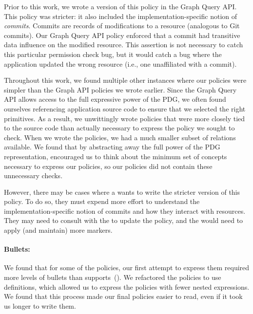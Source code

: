 Prior to this work, we wrote a version of this policy in the Graph Query API.
%
This policy was stricter: it also included the implementation-specific notion of \emph{commits}.
%
Commits are records of modifications to a resource (analogous to Git commits).
%
Our Graph Query API policy enforced that a commit had transitive data influence on the modified resource.
%
This assertion is not necessary to catch this particular permission check bug, 
but it would catch a bug where the application updated the wrong resource (i.e., one unaffiliated with a commit).
%

Throughout this work, we found multiple other instances where our \syslang{}
policies were simpler than the Graph API policies we wrote earlier.
%
Since the Graph Query API allows \devs{} access to the full expressive power of the PDG,
we often found ourselves referencing application source code to ensure that we selected the right primitives.
%
As a result, we unwittingly wrote policies that were more closely tied to the 
source code than actually necessary to express the policy we sought to check.
%
When we wrote the \syslang{} policies, 
we had a much smaller subset of relations available.
%
We found that by abstracting away the full power of the PDG representation,
\syslang{} encouraged us to think about the minimum set of concepts
necessary to express our policies,
so our policies did not contain these unnecessary checks.

However, there may be cases where a \ce{} wants to write the stricter version of this policy.
%
%
To do so, they must expend more effort to understand 
the implementation-specific notion of commits and how they interact with resources.
%
They may need to consult with the \dev{} to update the policy,
and the \dev{} would need to apply (and maintain) more markers.

\paragraph{Bullets:} We found that for some of the policies, 
our first attempt to express them required more levels of bullets than \sys{} supports~().
%
We refactored the policies to use definitions, 
which allowed us to express the policies with fewer nested expressions.
%
We found that this process made our final policies easier to read,
even if it took us longer to write them.